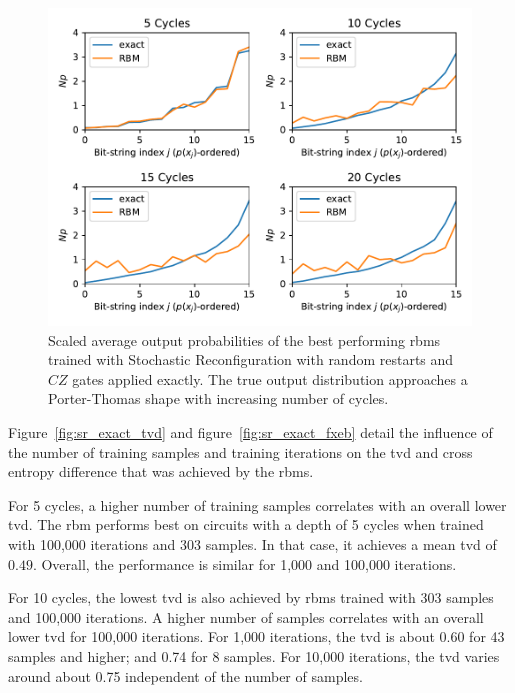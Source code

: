 \begin{figure}[H]
  \centering
  \includegraphics[width=\textwidth]{figures/results/sr-restarts-not-learned/avgBestPDF.pdf}
  \caption[Scaled Average Output Probabilities of Best Performing RBMs Trained with Stochastic Reconfiguration with Random Restarts and $CZ$ Gates Applied Exactly]{
    Scaled average output probabilities of the best performing \gls{rbm}s trained with Stochastic Reconfiguration with random restarts and $CZ$ gates applied exactly. The true 
    output distribution approaches a Porter-Thomas shape with increasing number of cycles.}
  \label{fig:sr_exact_bestPDF}
\end{figure}

Figure~\ref{fig:sr_exact_tvd} and figure~\ref{fig:sr_exact_fxeb} detail the influence of the 
number of training samples and training iterations on the \gls{tvd} and cross entropy difference that was achieved by 
the \gls{rbm}s. 

For 5 cycles, a higher number of training samples 
correlates with an overall lower \gls{tvd}. The \gls{rbm} performs best on 
circuits with a depth of 5 cycles when trained with 100,000 iterations and 303 samples. In that case, 
it achieves a mean \gls{tvd} of $0.49$. Overall, the performance is similar for 1,000 and 100,000 iterations.

For 10 cycles, the lowest \gls{tvd} is also achieved by \gls{rbm}s trained with 303 samples and 100,000 iterations.
A higher number of samples correlates with an overall lower \gls{tvd} for 100,000 iterations. For 1,000 iterations, 
the \gls{tvd} is about 0.60 for 43 samples and higher; and 0.74 for 8 samples. For 10,000 iterations, the \gls{tvd} varies 
around about 0.75 independent of the number of samples. 

